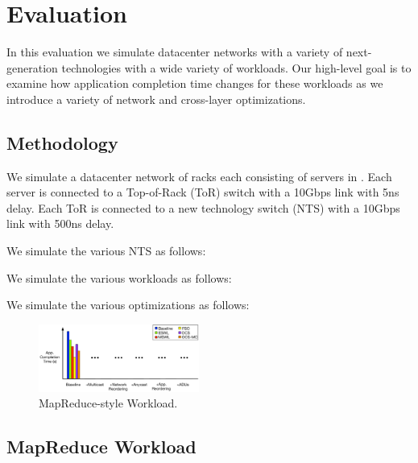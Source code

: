 \newpage\phantom{t}
\section{Evaluation}
\label{sec:eval}

In this evaluation we simulate datacenter networks with a variety of
next-generation technologies with a wide variety of workloads. Our high-level
goal is to examine how application completion time changes for these workloads
as we introduce a variety of network and cross-layer optimizations.


\subsection{Methodology}
\label{sec:methodology}

We simulate a datacenter network of  racks each consisting of
 servers in . Each server is connected to a Top-of-Rack
(ToR) switch with a 10Gbps link with 5ns delay. Each ToR is connected to a new
technology switch (NTS) with a 10Gbps link with 500ns delay.

We simulate the various NTS as follows: 

We simulate the various workloads as follows: 

We simulate the various optimizations as follows: 



\newpage\phantom{t}
\begin{figure}[t!!!]
\centering
\includegraphics[width=0.47\textwidth]{figures/eval/map_red}
\caption{MapReduce-style Workload.}
\label{fig:eval_MR}
\end{figure}

\subsection{MapReduce Workload}
\label{sec:eval_MR}






